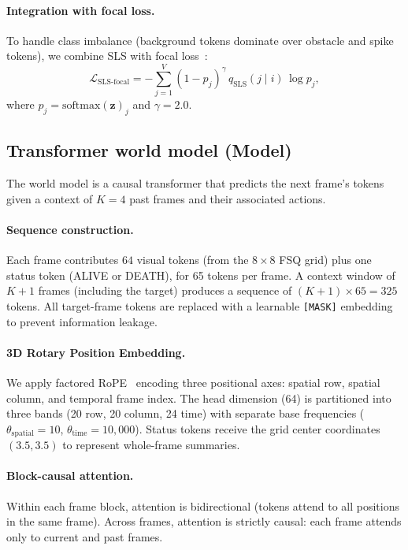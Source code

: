 \documentclass{article}
\newcommand{\nctx}{4}
\newcommand{\ntokens}{64}
\newcommand{\gridsize}{8 \times 8}
\newcommand{\focalgamma}{2.0}
\begin{document}
\paragraph{Integration with focal loss.}
To handle class imbalance (background tokens dominate over obstacle and spike tokens), we combine SLS with focal loss~\citep{lin2017focal}:
\begin{equation}
  \mathcal{L}_\text{SLS-focal} = -\sum_{j=1}^{V} (1 - p_j)^\gamma \, q_\text{SLS}(j \mid i) \, \log p_j,
  \label{eq:sls_focal}
\end{equation}
where $p_j = \text{softmax}(\mathbf{z})_j$ and $\gamma = \focalgamma$.

\subsection{Transformer world model (Model)}
\label{sec:transformer}

The world model is a causal transformer that predicts the next frame's tokens given a context of $K = \nctx$ past frames and their associated actions.

\paragraph{Sequence construction.}
Each frame contributes $\ntokens$ visual tokens (from the $\gridsize$ FSQ grid) plus one status token (ALIVE or DEATH), for 65 tokens per frame.
A context window of $K + 1$ frames (including the target) produces a sequence of $(K+1) \times 65 = 325$ tokens.
All target-frame tokens are replaced with a learnable \texttt{[MASK]} embedding to prevent information leakage.

\paragraph{3D Rotary Position Embedding.}
We apply factored RoPE~\citep{su2024rope} encoding three positional axes: spatial row, spatial column, and temporal frame index.
The head dimension (64) is partitioned into three bands (20 row, 20 column, 24 time) with separate base frequencies ($\theta_\text{spatial} = 10$, $\theta_\text{time} = 10{,}000$).
Status tokens receive the grid center coordinates $(3.5, 3.5)$ to represent whole-frame summaries.

\paragraph{Block-causal attention.}
Within each frame block, attention is bidirectional (tokens attend to all positions in the same frame).
Across frames, attention is strictly causal: each frame attends only to current and past frames.
\end{document}

